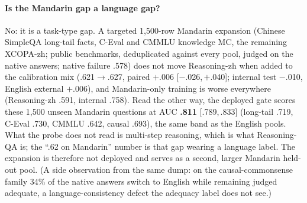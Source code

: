 \paragraph{Is the Mandarin gap a language gap?} No: it is a task-type
gap. A targeted 1{,}500-row Mandarin expansion (Chinese SimpleQA
long-tail facts, C-Eval and CMMLU knowledge MC, the remaining
XCOPA-zh; public benchmarks, deduplicated against every pool, judged
on the native answers; native failure .578) does not move
Reasoning-zh when added to the calibration mix (.621$\to$.627,
paired $+$.006 [$-$.026,\,$+$.040]; internal test $-$.010, English
external $+$.006), and Mandarin-only training is worse everywhere
(Reasoning-zh .591, internal .758). Read the other way, the deployed
gate scores these 1{,}500 unseen Mandarin questions at AUC
\textbf{.811} [.789,\,.833] (long-tail .719, C-Eval .730, CMMLU .642,
causal .693), the same band as the English pools. What the probe
does not read is multi-step reasoning, which is what Reasoning-QA
is; the ``.62 on Mandarin'' number is that gap wearing a language
label. The expansion is therefore not deployed and serves as a second,
larger Mandarin held-out pool. (A side observation from the same
dump: on the causal-commonsense family 34\% of the native answers
switch to English while remaining judged adequate, a
language-consistency defect the adequacy label does not see.)

